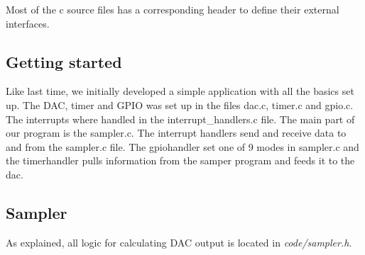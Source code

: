 Most of the c source files has a corresponding header to define their external interfaces.

\subsection{Getting started}
Like last time, we initially developed a simple application with all the basics set up. The DAC, timer and GPIO was set up in the files dac.c, timer.c and gpio.c. The interrupts where handled in the interrupt\_handlers.c file. The main part of our program is the sampler.c. The interrupt handlers send and receive data to and from the sampler.c file. The gpiohandler set one of 9 modes in sampler.c and the timerhandler pulls information from the samper program and feeds it to the dac. 

\subsection{Sampler}
As explained, all logic for calculating DAC output is located in \emph{code/sampler.h}.
